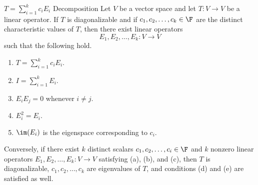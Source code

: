 \documentclass[linearalgebraII]{subfiles}
\begin{document}
    \clearpage
    \begin{theorem}{$T = \sum^{k}_{i=1} c_iE_i$ Decomposition}
        Let $V$ be a vector space and let $T:V\to V$ be a linear operator. If $T$ is diagonalizable and if $c_1, c_2, \ldots, c_k\in \F$ are the distinct characteristic values of $T$, then there exist linear operators 
        \begin{equation*}
            E_1, E_2, \ldots, E_k :V\to V 
        \end{equation*}
        such that the following hold.
        \begin{enumerate}
            \item $T = \sum^{k}_{i=1} c_iE_i$.
            \item $I = \sum^{k}_{i=1} E_i$.
            \item $E_iE_j = 0$ whenever $i\neq j$.
            \item $E_i^2 = E_i$.
            \item $\im(E_i)$ is the eigenspace corresponding to $c_i$.
        \end{enumerate}
        Conversely, if there exist $k$ distinct scalars $c_1, c_2, \ldots, c_i\in \F$ and $k$ nonzero linear operators $E_1, E_2, \ldots, E_k: V\to V$ satisfying (a), (b), and (c), then $T$ is diagonalizable, $c_1, c_2, \ldots, c_k$ are eigenvalues of $T$, and conditions (d) and (e) are satisfied as well.
    \end{theorem}
\end{document}

